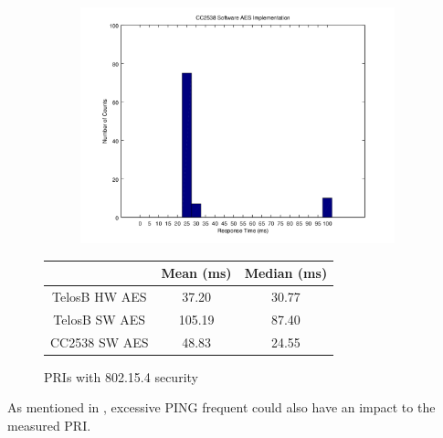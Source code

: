 \begin{figure}[ht!]
\begin{subfigure}{0.4\textwidth}
{		\includegraphics[width=\textwidth]{fig/noncoresec_ping_cc2538_sw.png}
	}
	\end{subfigure}

	{
		\begin{tabular}{|c|c|c|}
			\hline
			              & Mean (ms)     & Median (ms)   \\ \hline
			TelosB HW AES & 37.20 & 30.77 \\ \hline
			TelosB SW AES & 105.19        & 87.40          \\ \hline
			CC2538 SW AES & 48.83         & 24.55          \\ \hline
		\end{tabular}
	}
	
	\caption{PRIs with 802.15.4 security\label{802154SecPRI}}
\end{figure}

As mentioned in , excessive PING frequent could also have an impact to the measured PRI.


